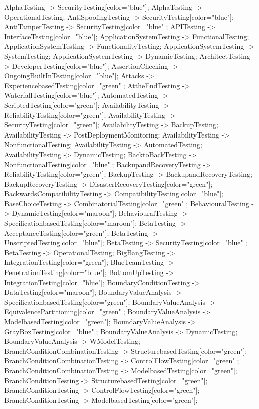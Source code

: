 \documentclass{article}
\begin{document}
{AlphaTesting -> SecurityTesting[color="blue"];
AlphaTesting -> OperationalTesting;
AntiSpoofingTesting -> SecurityTesting[color="blue"];
AntiTamperTesting -> SecurityTesting[color="blue"];
APITesting -> InterfaceTesting[color="blue"];
ApplicationSystemTesting -> FunctionalTesting;
ApplicationSystemTesting -> FunctionalityTesting;
ApplicationSystemTesting -> SystemTesting;
ApplicationSystemTesting -> DynamicTesting;
ArchitectTesting -> DeveloperTesting[color="blue"];
AssertionChecking -> OngoingBuiltInTesting[color="blue"];
Attacks -> ExperiencebasedTesting[color="green"];
AttheEndTesting -> WaterfallTesting[color="blue"];
AutomatedTesting -> ScriptedTesting[color="green"];
AvailabilityTesting -> ReliabilityTesting[color="green"];
AvailabilityTesting -> SecurityTesting[color="green"];
AvailabilityTesting -> BackupTesting;
AvailabilityTesting -> PostDeploymentMonitoring;
AvailabilityTesting -> NonfunctionalTesting;
AvailabilityTesting -> AutomatedTesting;
AvailabilityTesting -> DynamicTesting;
BacktoBackTesting -> NonfunctionalTesting[color="blue"];
BackupandRecoveryTesting -> ReliabilityTesting[color="green"];
BackupTesting -> BackupandRecoveryTesting;
BackupRecoveryTesting -> DisasterRecoveryTesting[color="green"];
BackwardsCompatibilityTesting -> CompatibilityTesting[color="blue"];
BaseChoiceTesting -> CombinatorialTesting[color="green"];
BehaviouralTesting -> DynamicTesting[color="maroon"];
BehaviouralTesting -> SpecificationbasedTesting[color="maroon"];
BetaTesting -> AcceptanceTesting[color="green"];
BetaTesting -> UnscriptedTesting[color="blue"];
BetaTesting -> SecurityTesting[color="blue"];
BetaTesting -> OperationalTesting;
BigBangTesting -> IntegrationTesting[color="green"];
BlueTeamTesting -> PenetrationTesting[color="blue"];
BottomUpTesting -> IntegrationTesting[color="blue"];
BoundaryConditionTesting -> DataTesting[color="maroon"];
BoundaryValueAnalysis -> SpecificationbasedTesting[color="green"];
BoundaryValueAnalysis -> EquivalencePartitioning[color="green"];
BoundaryValueAnalysis -> ModelbasedTesting[color="green"];
BoundaryValueAnalysis -> GrayBoxTesting[color="blue"];
BoundaryValueAnalysis -> DynamicTesting;
BoundaryValueAnalysis -> WModelTesting;
BranchConditionCombinationTesting -> StructurebasedTesting[color="green"];
BranchConditionCombinationTesting -> ControlFlowTesting[color="green"];
BranchConditionCombinationTesting -> ModelbasedTesting[color="green"];
BranchConditionTesting -> StructurebasedTesting[color="green"];
BranchConditionTesting -> ControlFlowTesting[color="green"];
BranchConditionTesting -> ModelbasedTesting[color="green"];
}
\end{document}
